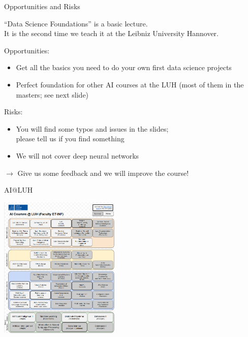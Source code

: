 \documentclass[aspectratio=169]{../latex_main/tntbeamer}  %
\begin{document}
\begin{frame}[c]{Opportunities and Risks}

``Data Science Foundations'' is a basic lecture.\\ It is the second time we teach it at the Leibniz University Hannover.

\bigskip
\pause

Opportunities:
\begin{itemize}
  \item Get all the basics you need to do your own first data science projects
  \item Perfect foundation for other AI courses at the LUH (most of them in the masters; see next slide)
\end{itemize}

\medskip

Risks:
\begin{itemize}
  \item You will find some typos and issues in the slides;\\ please tell us if you find something
  \item We will not cover deep neural networks
\end{itemize}

\medskip
$\to$ Give us some feedback and we will improve the course!

\end{frame}
\begin{frame}[c]{AI@LUH}

\vspace{-2em}
\centering
\includegraphics[width=0.43\textwidth]{figures/ai_luh.png}

\end{frame}
\end{document}
